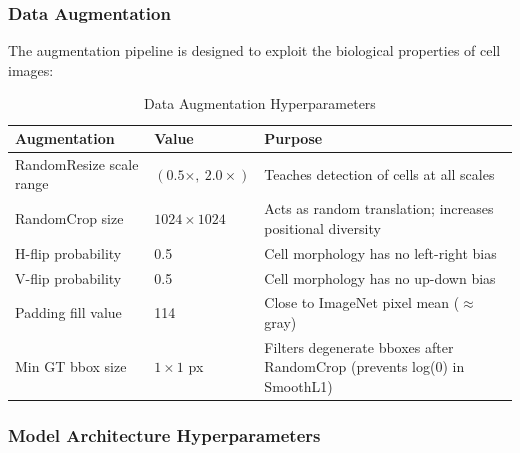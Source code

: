\documentclass[a4paper]{article} %
\begin{document}
\subsubsection{Data Augmentation}

The augmentation pipeline is designed to exploit the biological properties of cell images:

\begin{table}[H]
\centering
\caption{Data Augmentation Hyperparameters}
\label{tab:aug_hyperparams}
\begin{tabular}{lll}
\toprule
\textbf{Augmentation} & \textbf{Value} & \textbf{Purpose} \\
\midrule
RandomResize scale range & $(0.5\times,\ 2.0\times)$ & Teaches detection of cells at all scales \\
RandomCrop size          & $1024\times1024$          & Acts as random translation; increases positional diversity \\
H-flip probability       & 0.5                       & Cell morphology has no left-right bias \\
V-flip probability       & 0.5                       & Cell morphology has no up-down bias \\
Padding fill value       & 114                       & Close to ImageNet pixel mean ($\approx$gray) \\
Min GT bbox size         & $1\times1$ px             & Filters degenerate bboxes after RandomCrop (prevents log(0) in SmoothL1) \\
\bottomrule
\end{tabular}
\end{table}

\subsubsection{Model Architecture Hyperparameters}
\end{document}
